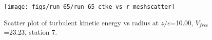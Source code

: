 \begin{figure}[H]
\centering
\texttt{[image: figs/run\_65/run\_65\_ctke\_vs\_r\_meshscatter]}
\caption{Scatter plot of turbulent kinetic energy vs radius at $z/c$=10.00, $V_{free}$=23.23, station 7.}
\end{figure}


